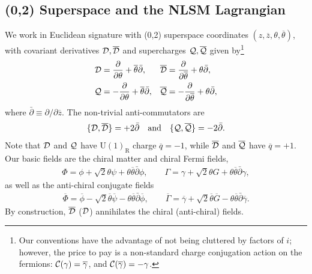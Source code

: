 \documentclass[11pt, a4paper]{article}
\def\AC#1#2{{\{#1,#2\}}}
\def\cDb{{\overline{\cD}}}
\def\cQb{{\overline{\cQ}}}
\def\GUR{\GU(1)_{\text{R}}}
\def\GU{\operatorname{U{}}}
\def\p{\partial}
\def\pb{\bar{\partial}}
\def\cC{{\cal C}}
\def\cD{{\cal D}}
\def\cQ{{\cal Q}}
\newcommand\gammab{\overline{\gamma}}
\newcommand\thetab{\overline{\theta}}
\newcommand\phib{\overline{\phi}}
\newcommand\psib{\overline{\psi}}
\newcommand\Gammab{\overline{\Gamma}}
\newcommand\Phib{\overline{\Phi}}
\newcommand\qb{\overline{q}}
\newcommand\zb{\overline{z}}
\newcommand\Gb{\overline{G}}
\def\cDb{\overline{\cD}}
\def\cQb{\overline{\cQ}}
\begin{document}
\subsection{(0,2) Superspace and the NLSM Lagrangian}
 We work in Euclidean signature with (0,2) superspace coordinates $(z,\zb,\theta,\thetab)$, with covariant derivatives $\cD,\cDb$ and supercharges $\cQ,\cQb$ 
given by\footnote{Our conventions have the advantage of not being cluttered by
factors of $i$; however, the price to pay is a non-standard charge conjugation action on the fermions: $\cC(\gamma) = \gammab$, and $\cC(\gammab) = -\gamma$.}
\begin{align*}
\cD & = \frac{\p}{\p \theta} + \thetab \pb, & 
\cDb & = \frac{\p}{\p \thetab}  + \theta \pb, \nonumber\\
\cQ &  = - \frac{\p}{\p\theta} + \thetab \pb, &
\cQb & = - \frac{\p}{\p\thetab} + \theta \pb,
\end{align*}
where $\pb \equiv \p /\p \zb$.
The non-trivial anti-commutators are 
$$\AC{\cD}{\cDb} = +2 \pb \quad\text{and}\quad \AC{\cQ}{\cQb} = -2 \pb.$$
Note that $\cD$ and $\cQ$ have $\GUR$ charge $\qb=-1$, while $\cDb$ and $\cQb$ have $\qb=+1$. 
Our basic fields are the chiral matter and chiral Fermi fields,
\begin{align*}
\Phi = \phi+\sqrt{2} \theta\psi+\theta\thetab \pb \phi, \qquad
\Gamma = \gamma + \sqrt{2} \theta G + \theta\thetab \pb \gamma,
\end{align*}
as well as the anti-chiral conjugate fields
\begin{align*}
\Phib = \phib-\sqrt{2} \thetab\psib-\theta\thetab \pb \phib, \qquad
\Gammab = \gammab + \sqrt{2} \thetab \Gb - \theta\thetab \pb \gammab.
\end{align*}
By construction, $\cDb$ ($\cD$) annihilates the chiral (anti-chiral) fields.
\end{document}
